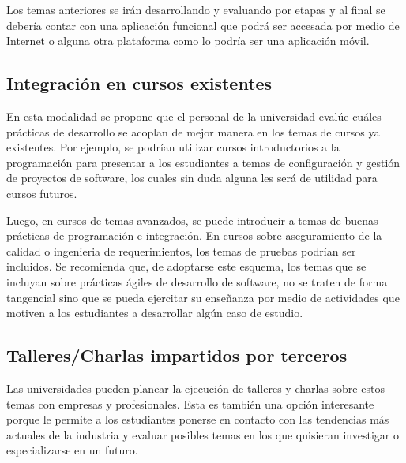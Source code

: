 Los temas anteriores se irán desarrollando y evaluando por etapas y al final se debería contar con una aplicación funcional que podrá ser accesada por medio de Internet o alguna otra plataforma como lo podría ser una aplicación móvil.


\subsection{Integración en cursos existentes}
En esta modalidad se propone que el personal de la universidad evalúe cuáles prácticas de desarrollo se acoplan de mejor manera en los temas de cursos ya existentes. Por ejemplo, se podrían utilizar cursos introductorios a la programación para presentar a los estudiantes a temas de configuración y gestión de proyectos de software, los cuales sin duda alguna les será de utilidad para cursos futuros.

Luego, en cursos de temas avanzados, se puede introducir a temas de buenas prácticas de programación e integración. En cursos sobre aseguramiento de la calidad o ingenieria de requerimientos, los temas de pruebas podrían ser incluidos. Se recomienda que, de adoptarse este esquema, los temas que se incluyan sobre prácticas ágiles de desarrollo de software, no se traten de forma tangencial sino que se pueda ejercitar su enseñanza por medio de actividades que motiven a los estudiantes a desarrollar algún caso de estudio.


\subsection{Talleres/Charlas impartidos por terceros}
Las universidades pueden planear la ejecución de talleres y charlas sobre estos temas con empresas y profesionales. Esta es también una opción interesante porque le permite a los estudiantes ponerse en contacto con las tendencias más actuales de la industria y evaluar posibles temas en los que quisieran investigar o especializarse en un futuro.